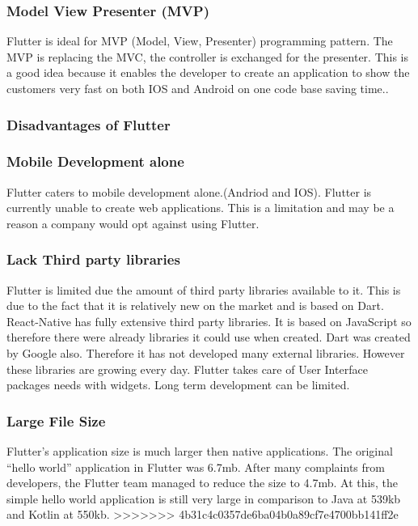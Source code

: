 \subsubsection{Model View Presenter (MVP)}
Flutter is ideal for MVP (Model, View, Presenter) programming pattern. The MVP is replacing the MVC, the controller is exchanged for the presenter. This is a good idea because it enables the developer to create an application to show the customers very fast on both IOS and Android on one code base saving time.\cite{pros_cons}.

\subsubsection{Disadvantages of Flutter}

\subsubsection{Mobile Development alone}
Flutter caters to mobile development alone.(Andriod and IOS). Flutter is currently unable to create web applications. This is a limitation and may be a reason a company would opt against using Flutter.

\subsubsection{Lack Third party libraries}
Flutter is limited due the amount of third party libraries available to it. This is due to the fact that it is relatively new on the market and is based on Dart.\cite{pros_cons} React-Native has fully extensive third party libraries. It is based on JavaScript so therefore there were already libraries it could use when created. Dart was created by Google also. Therefore it has not developed many external libraries. However these libraries are growing every day. Flutter takes care of User Interface packages needs with widgets. Long term development can be limited.\cite{good_bad}

\subsubsection{Large File Size}
Flutter’s application size is much larger then native applications. The original “hello world” application in Flutter was 6.7mb. After many complaints from developers, the Flutter team managed to reduce the size to 4.7mb. At this, the simple hello world application is still very large in comparison to Java at 539kb and Kotlin at 550kb.\cite{faq_2019} \cite{good_bad}
>>>>>>> 4b31c4c0357de6ba04b0a89cf7e4700bb141ff2e



